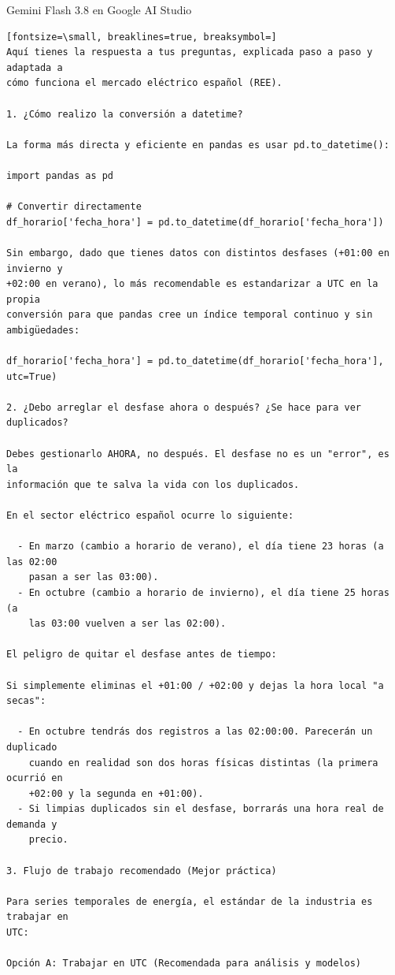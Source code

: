 \documentclass[12pt,a4paper,oneside]{book}
\begin{document}
\begin{iaresp}{Gemini Flash 3.8 en Google AI Studio}
\begin{Verbatim}[fontsize=\small, breaklines=true, breaksymbol=]
Aquí tienes la respuesta a tus preguntas, explicada paso a paso y adaptada a
cómo funciona el mercado eléctrico español (REE).

1. ¿Cómo realizo la conversión a datetime?

La forma más directa y eficiente en pandas es usar pd.to_datetime():

import pandas as pd

# Convertir directamente
df_horario['fecha_hora'] = pd.to_datetime(df_horario['fecha_hora'])

Sin embargo, dado que tienes datos con distintos desfases (+01:00 en invierno y
+02:00 en verano), lo más recomendable es estandarizar a UTC en la propia
conversión para que pandas cree un índice temporal continuo y sin ambigüedades:

df_horario['fecha_hora'] = pd.to_datetime(df_horario['fecha_hora'], utc=True)

2. ¿Debo arreglar el desfase ahora o después? ¿Se hace para ver duplicados?

Debes gestionarlo AHORA, no después. El desfase no es un "error", es la
información que te salva la vida con los duplicados.

En el sector eléctrico español ocurre lo siguiente:

  - En marzo (cambio a horario de verano), el día tiene 23 horas (a las 02:00
    pasan a ser las 03:00).
  - En octubre (cambio a horario de invierno), el día tiene 25 horas (a
    las 03:00 vuelven a ser las 02:00).

El peligro de quitar el desfase antes de tiempo:

Si simplemente eliminas el +01:00 / +02:00 y dejas la hora local "a secas":

  - En octubre tendrás dos registros a las 02:00:00. Parecerán un duplicado
    cuando en realidad son dos horas físicas distintas (la primera ocurrió en
    +02:00 y la segunda en +01:00).
  - Si limpias duplicados sin el desfase, borrarás una hora real de demanda y
    precio.

3. Flujo de trabajo recomendado (Mejor práctica)

Para series temporales de energía, el estándar de la industria es trabajar en
UTC:

Opción A: Trabajar en UTC (Recomendada para análisis y modelos)


\end{Verbatim}
\end{iaresp}
\end{document}
